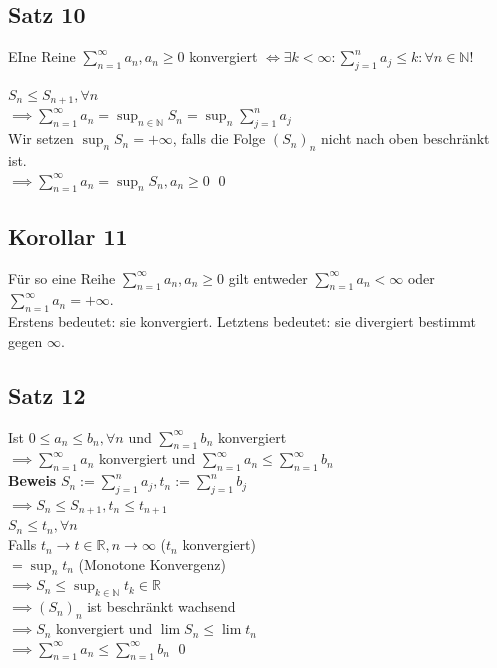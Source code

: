 \documentclass[fleqn]{scrbook}
\renewenvironment{proof}{{\bfseries Beweis }}{\qed}
\begin{document}
\subsection{Satz 10}
EIne Reine $\sum_{n=1}^\infty a_n, a_n \geq 0$ konvergiert $\Leftrightarrow \exists k < \infty : \sum_{j=1}^n a_j \leq k: \forall n \in \mathbb{N}$!

\begin{proof}
$S_n \leq S_{n+1}, \forall n$\\
$\implies \sum_{n=1}^\infty a_n = \sup_{n\in\mathbb{N}} S_n = \sup_{n} \sum_{j=1}^n a_j$\\
Wir setzen $\sup_n S_n = + \infty$, falls die Folge $(S_n)_n$ nicht nach oben beschränkt ist.\\
$\implies \sum_{n=1}^\infty a_n = \sup_n S_n, a_n \geq 0$
\end{proof}

\subsection{Korollar 11}
Für so eine Reihe $\sum_{n=1}^\infty a_n, a_n \geq 0$ gilt entweder $\sum_{n=1}^\infty a_n < \infty$ oder $\sum_{n=1}^\infty a_n = + \infty$.\\
Erstens bedeutet: sie konvergiert. Letztens bedeutet: sie divergiert bestimmt gegen $\infty$.

\subsection{Satz 12}
Ist $0\leq a_n \leq b_n, \forall n$ und $\sum_{n=1}^\infty b_n$ konvergiert\\
$\implies \sum_{n=1}^\infty a_n$ konvergiert und 
$\sum_{n=1}^\infty a_n \leq \sum_{n=1}^\infty b_n$\\

\begin{proof}
$S_n := \sum_{j=1}^n a_j, t_n := \sum_{j=1}^n b_j$\\
$\implies S_n \leq S_{n+1}, t_n \leq t_{n+1}$\\
$S_n \leq t_n, \forall n$\\
Falls $t_n \rightarrow t \in \mathbb{R}, n \rightarrow \infty
$ ($t_n$ konvergiert)\\
$=\sup_n t_n$ (Monotone Konvergenz)\\
$\implies S_n \leq \sup_{k\in\mathbb{N}} t_k \in \mathbb{R}$\\
$\implies (S_n)_n$ ist beschränkt wachsend\\
$\implies S_n$ konvergiert und $\lim S_n \leq \lim t_n$\\
$\implies \sum_{n=1}^\infty a_n \leq \sum_{n=1}^\infty b_n$
\end{proof}
\end{document}
